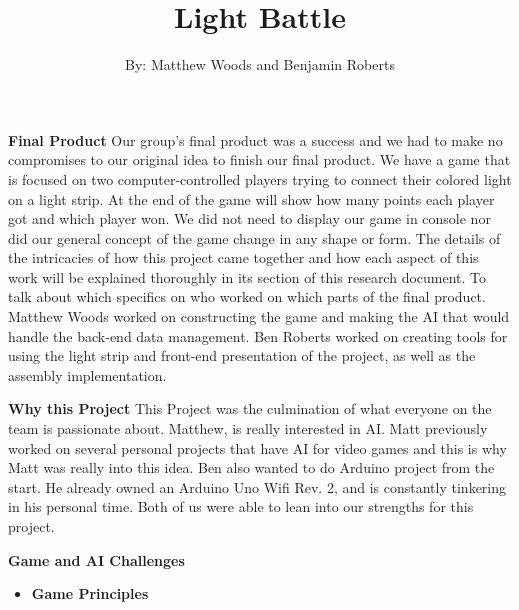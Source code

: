 \documentclass[twoside]{article}
\begin{document}
\doublespacing
\title{Light Battle}
\author{By: Matthew Woods and Benjamin Roberts}
\maketitle
\renewcommand{\labelitemi}{$\diamond$}


\noindent\textbf{\Large Final Product}
\hfill \break
\text Our group's final product was a success and we had to make no compromises to our original idea to finish our final product. We have a game that is focused on two computer-controlled players trying to connect their colored light on a light strip. At the end of the game will show how many points each player got and which player won. We did not need to display our game in console nor did our general concept of the game change in any shape or form. The details of the intricacies of how this project came together and how each aspect of this work will be explained thoroughly in its section of this research document. To talk about which specifics on who worked on which parts of the final product. Matthew Woods worked on constructing the game and making the AI that would handle the back-end data management. Ben Roberts worked on creating tools for using the light strip and front-end presentation of the project, as well as the assembly implementation.            

\hfill \break
\noindent\textbf{\Large Why this Project}
\hfill \break
This Project was the culmination of what everyone on the team is passionate about. Matthew, is really interested in AI. Matt previously worked on several personal projects that have AI for video games and this is why Matt was really into this idea. Ben also wanted to do Arduino project from the start. He already owned an Arduino Uno Wifi Rev. 2, and is constantly tinkering in his personal time. Both of us were able to lean into our strengths for this project.

\hfill \break
\noindent\textbf{\Large Game and AI Challenges}
\begin{itemize}
    \item\textbf{Game Principles}
\end{itemize}
\end{document}
